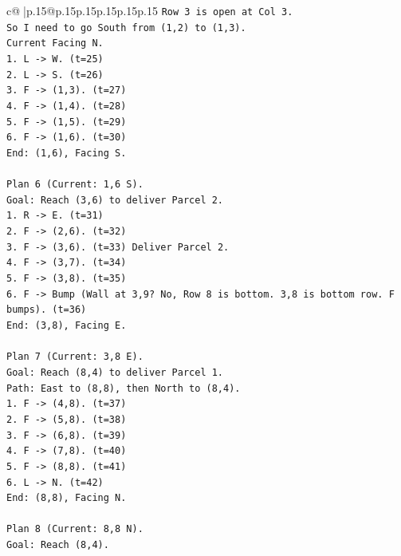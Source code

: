 \documentclass{article}
\begin{document}
{\begin{supertabular}{c@{$\;$}|p{.15\linewidth}@{}p{.15\linewidth}p{.15\linewidth}p{.15\linewidth}p{.15\linewidth}p{.15\linewidth}}
{{{\texttt{Row 3 is open at Col 3.} \\
\texttt{So I need to go South from (1,2) to (1,3).} \\
\texttt{Current Facing N.} \\
\texttt{1. L {-}> W. (t=25)} \\
\texttt{2. L {-}> S. (t=26)} \\
\texttt{3. F {-}> (1,3). (t=27)} \\
\texttt{4. F {-}> (1,4). (t=28)} \\
\texttt{5. F {-}> (1,5). (t=29)} \\
\texttt{6. F {-}> (1,6). (t=30)} \\
\texttt{End: (1,6), Facing S.} \\
\\ 
\texttt{Plan 6 (Current: 1,6 S).} \\
\texttt{Goal: Reach (3,6) to deliver Parcel 2.} \\
\texttt{1. R {-}> E. (t=31)} \\
\texttt{2. F {-}> (2,6). (t=32)} \\
\texttt{3. F {-}> (3,6). (t=33) Deliver Parcel 2.} \\
\texttt{4. F {-}> (3,7). (t=34)} \\
\texttt{5. F {-}> (3,8). (t=35)} \\
\texttt{6. F {-}> Bump (Wall at 3,9? No, Row 8 is bottom. 3,8 is bottom row. F bumps). (t=36)} \\
\texttt{End: (3,8), Facing E.} \\
\\ 
\texttt{Plan 7 (Current: 3,8 E).} \\
\texttt{Goal: Reach (8,4) to deliver Parcel 1.} \\
\texttt{Path: East to (8,8), then North to (8,4).} \\
\texttt{1. F {-}> (4,8). (t=37)} \\
\texttt{2. F {-}> (5,8). (t=38)} \\
\texttt{3. F {-}> (6,8). (t=39)} \\
\texttt{4. F {-}> (7,8). (t=40)} \\
\texttt{5. F {-}> (8,8). (t=41)} \\
\texttt{6. L {-}> N. (t=42)} \\
\texttt{End: (8,8), Facing N.} \\
\\ 
\texttt{Plan 8 (Current: 8,8 N).} \\
\texttt{Goal: Reach (8,4).} \\
}}}
\end{supertabular}}
\end{document}
